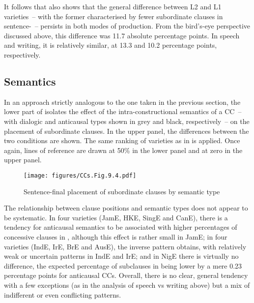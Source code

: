 It follows that  also shows that the general difference between L2 and L1 varieties~– with the former characterised by fewer subordinate clauses in sentence-~– persists in both modes of production. From the bird’s-eye perspective discussed above, this difference was 11.7 absolute percentage points. In speech and writing, it is relatively similar, at 13.3 and 10.2 percentage points, respectively.

\subsection{\label{bkm:Ref59129356}Semantics}\label{sec:9.2.2}

In an approach strictly analogous to the one taken in the previous section, the lower part of  isolates the effect of the intra-constructional semantics of a CC~– with dialogic and anticausal types shown in grey and black, respectively~– on the placement of subordinate clauses. In the upper panel, the differences between the two conditions are shown. The same ranking of varieties as in  is applied. Once again, lines of reference are drawn at 50\% in the lower panel and at zero in the upper panel.

\begin{figure}
\texttt{[image: figures/CCs.Fig.9.4.pdf]}
\caption{\label{bkm:Ref59219422}\label{fig:9.4}Sentence-final placement of subordinate clauses by semantic type}
\end{figure}

The relationship between clause positions and semantic types does not appear to be systematic. In four varieties (JamE, HKE, SingE and CanE), there is a tendency for anticausal semantics to be associated with higher percentages of concessive clauses in , although this effect is rather small in JamE; in four varieties (IndE, IrE, BrE and AusE), the inverse pattern obtains, with relatively weak or uncertain patterns in IndE and IrE; and in NigE there is virtually no difference, the expected percentage of subclauses in  being lower by a mere 0.23 percentage points for anticausal CCs. Overall, there is no clear, general tendency with a few exceptions (as in the analysis of speech vs writing above) but a mix of indifferent or even conflicting patterns.

